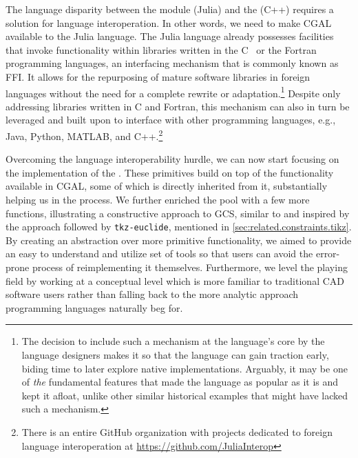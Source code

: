 The language disparity between the \primitives{} module (Julia) and the
\geomlibrary{} (C++) requires a solution for language interoperation.  In other
words, we need to make \ac{CGAL} available to the Julia language.  The Julia
language already possesses facilities that invoke functionality within libraries
written in the C~\cite{Kernighan:1988:C} or the
Fortran~\cite{Backus:1957:Fortran} programming languages, an interfacing
mechanism that is commonly known as \ac{FFI}.  It allows for the repurposing of
mature software libraries in foreign languages without the need for a complete
rewrite or adaptation.\footnote{The decision to include such a mechanism at the
language's core by the language designers makes it so that the language can gain
traction early, biding time to later explore native implementations.  Arguably,
it may be one of \emph{the} fundamental features that made the language as
popular as it is and kept it afloat, unlike other similar historical examples
that might have lacked such a mechanism.}  Despite only addressing libraries
written in C and Fortran, this mechanism can also in turn be leveraged and built
upon to interface with other programming languages, e.g., Java, Python, MATLAB,
and C++.\footnote{There is an entire GitHub organization with projects dedicated
to foreign language interoperation at \url{https://github.com/JuliaInterop}}

Overcoming the language interoperability hurdle, we can now start focusing on
the implementation of the \primitives{}.  These primitives build on top of the
functionality available in \ac{CGAL}, some of which is directly inherited from
it, substantially helping us in the process.  We further enriched the pool with
a few more functions, illustrating a constructive approach to \ac{GCS}, similar
to and inspired by the approach followed by \texttt{tkz-euclide}, mentioned in
\cref{sec:related.constraints.tikz}.  By creating an abstraction over more
primitive functionality, we aimed to provide an easy to understand and utilize
set of tools so that users can avoid the error-prone process of reimplementing
it themselves.  Furthermore, we level the playing field by working at a
conceptual level which is more familiar to traditional \ac{CAD} software users
rather than falling back to the more analytic approach programming languages
naturally beg for.

